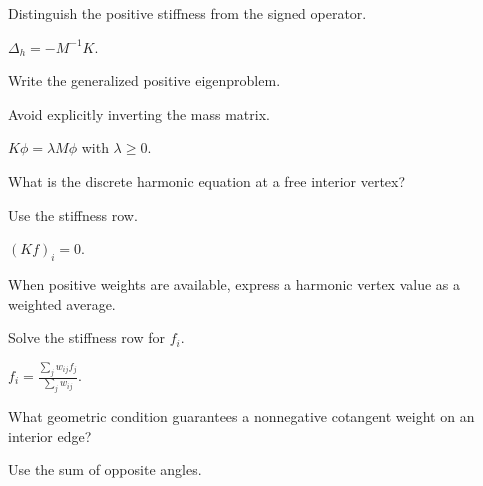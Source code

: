 \begin{hint}
Distinguish the positive stiffness from the signed operator.
\end{hint}

\begin{solution}
\(\Delta_h=-M^{-1}K\).
\end{solution}

\begin{exercise}\label{exr:vii41-15}
Write the generalized positive eigenproblem.
\end{exercise}

\begin{hint}
Avoid explicitly inverting the mass matrix.
\end{hint}

\begin{solution}
\(K\phi=\lambda M\phi\) with \(\lambda\ge0\).
\end{solution}

\begin{exercise}\label{exr:vii41-16}
What is the discrete harmonic equation at a free interior vertex?
\end{exercise}

\begin{hint}
Use the stiffness row.
\end{hint}

\begin{solution}
\((Kf)_i=0\).
\end{solution}

\begin{exercise}\label{exr:vii41-17}
When positive weights are available, express a harmonic vertex value as a weighted average.
\end{exercise}

\begin{hint}
Solve the stiffness row for \(f_i\).
\end{hint}

\begin{solution}
\(f_i=\frac{\sum_jw_{ij}f_j}{\sum_jw_{ij}}\).
\end{solution}

\begin{exercise}\label{exr:vii41-18}
What geometric condition guarantees a nonnegative cotangent weight on an interior edge?
\end{exercise}

\begin{hint}
Use the sum of opposite angles.
\end{hint}

